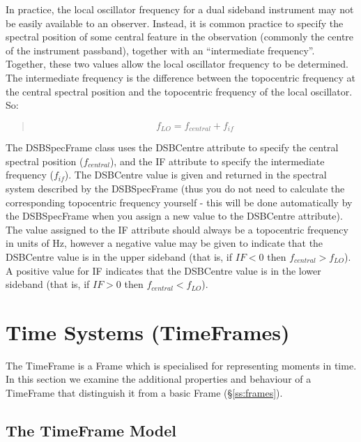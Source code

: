 \documentclass[twoside,11pt]{article}
\newcommand{\xlabel}[1]{}
\newcommand{\secref}[1]{\S\ref{#1}}
\newcommand{\secref}[1]{\ref{#1}}
\begin{document}
In practice, the local oscillator frequency for a dual sideband
instrument may not be easily available to an observer. Instead, it is
common practice to specify the spectral position of some central feature
in the observation (commonly the centre of the instrument passband),
together with an ``intermediate frequency''. Together, these two values
allow the local oscillator frequency to be determined. The intermediate
frequency is the difference between the topocentric frequency at the
central spectral position and the topocentric frequency of the local
oscillator. So:

\begin{quote}
\begin{small}
\begin{equation}
\label{eqn:dsb2}
   f_{LO} = f_{central} + f_{if}
\end{equation}
\end{small}
\end{quote}

The DSBSpecFrame class uses the DSBCentre attribute to specify the central
spectral position ($f_{central}$), and the IF attribute to specify the
intermediate frequency ($f_{if}$). The DSBCentre value is given and returned
in the spectral system described by the DSBSpecFrame (thus you do not need to
calculate the corresponding topocentric frequency yourself - this will be
done automatically by the DSBSpecFrame when you assign a new value to the
DSBCentre attribute). The value assigned to the IF attribute should
always be a topocentric frequency in units of Hz, however a negative
value may be given to indicate that the DSBCentre value is in the upper
sideband (that is, if $IF < 0$  then $f_{central} > f_{LO}$). A positive
value for IF indicates that the DSBCentre value is in the lower sideband
(that is, if $IF > 0$  then $f_{central} < f_{LO}$).


\cleardoublepage
\section{\xlabel{ss_timeframes}\label{ss:timeframes}Time Systems (TimeFrames)}

The TimeFrame is a Frame which is specialised for representing moments in
time. In this section we examine the additional properties and behaviour of a
TimeFrame that distinguish it from a basic Frame (\secref{ss:frames}).

\subsection{The TimeFrame Model}
\end{document}
